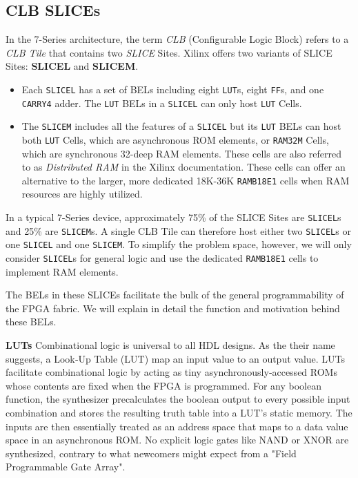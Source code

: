 \begin{multicols}{2}

\newpage
\subsection{CLB SLICEs}

In the 7-Series architecture, the term \emph{CLB} (Configurable Logic Block) refers to a \emph{CLB Tile} that contains two \emph{SLICE} Sites. 
Xilinx offers two variants of SLICE Sites: \textbf{SLICEL} and \textbf{SLICEM}.
\begin{itemize}
\item Each \texttt{SLICEL} has a set of BELs including eight \texttt{LUT}s, eight \texttt{FF}s, and one \texttt{CARRY4} adder. The \texttt{LUT} BELs in a \texttt{SLICEL} can only host \texttt{LUT} Cells. 
\item The \texttt{SLICEM} includes all the features of a \texttt{SLICEL} but its \texttt{LUT} BELs can host both \texttt{LUT} Cells, which are asynchronous ROM elements, or \texttt{RAM32M} Cells, which are synchronous 32-deep RAM elements. These cells are also referred to as \emph{Distributed RAM} in the Xilinx documentation.
    These cells can offer an alternative to the larger, more dedicated 18K-36K \texttt{RAMB18E1} cells when RAM resources are highly utilized. 
\end{itemize}
In a typical 7-Series device, approximately 75\% of the SLICE Sites are \texttt{SLICEL}s and 25\% are \texttt{SLICEM}s. 
A single CLB Tile can therefore host either two \texttt{SLICEL}s or one \texttt{SLICEL} and one \texttt{SLICEM}.
To simplify the problem space, however, we will only consider \texttt{SLICEL}s for general logic and use the dedicated \texttt{RAMB18E1} cells to implement RAM elements. 

The BELs in these SLICEs facilitate the bulk of the general programmability of the FPGA fabric. 
We will explain in detail the function and motivation behind these BELs. 


\textbf{LUTs} \quad
Combinational logic is universal to all HDL designs. 
As the their name suggests, a Look‑Up Table (LUT) map an input value to an output value. 
LUTs facilitate combinational logic by acting as tiny asynchronously‑accessed ROMs whose contents are fixed when the FPGA is programmed.  
For any boolean function, the synthesizer precalculates the boolean output to every possible input combination and stores the resulting truth table into a LUT's static memory. 
The inputs are then essentially treated as an address space that maps to a data value space in an asynchronous ROM. 
No explicit logic gates like NAND or XNOR are synthesized, contrary to what newcomers might expect from a "Field Programmable Gate Array". 


\end{multicols}
